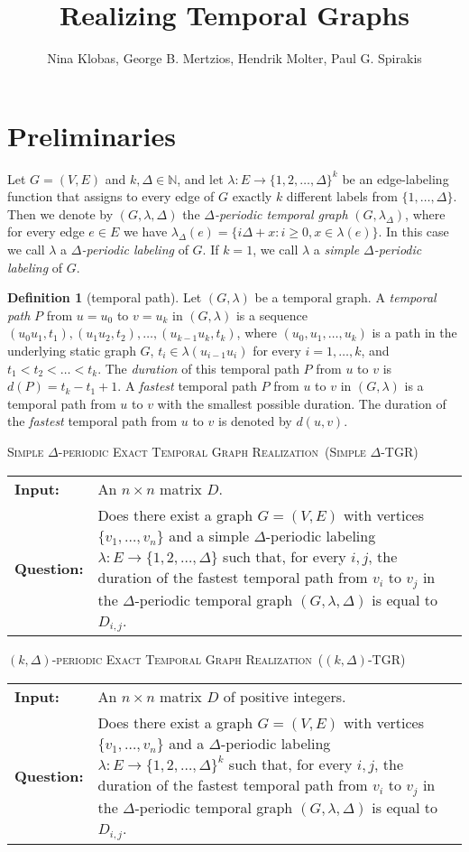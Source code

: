 \documentclass[11pt,a4paper]{article}
\title{Realizing Temporal Graphs}
\author{Nina Klobas, George B. Mertzios, Hendrik Molter, Paul G. Spirakis}
\makeatletter
\theoremstyle{remark}
\theoremstyle{definition}
\newtheorem{definition}[theorem]{Definition}
\newcommand{\problemdef}[3]{
	\begin{center}
		\begin{minipage}{0.95\textwidth}
			\noindent
			#1
			\vspace{5pt}\\
			\setlength{\tabcolsep}{3pt}
			\begin{tabularx}{\textwidth}{@{}lX@{}}
				\textbf{Input:}& #2 \\
				\textbf{Question:}& #3
			\end{tabularx}
		\end{minipage}
	\end{center}
}
\newcommand{\deltaExactLong}{\textsc{Simple $\Delta$-periodic Exact Temporal Graph Realization}}
\newcommand{\deltaExact}{\textsc{Simple $\Delta$-TGR}}
\newcommand{\kDeltaExactLong}{\textsc{$(k,\Delta)$-periodic Exact Temporal Graph Realization}}
\newcommand{\kDeltaExact}{\textsc{$(k,\Delta)$-TGR}}
\makeatother
\begin{document}
	\maketitle

\section{Preliminaries}

Let $G=(V,E)$ and $k,\Delta\in \mathbb{N}$, and let $\lambda: E \rightarrow \{1,2,\ldots,\Delta\}^k$ be an edge-labeling function that assigns to every edge of $G$ exactly $k$ different labels from $\{1,\ldots,\Delta\}$. 
Then we denote by $(G,\lambda,\Delta)$ the \emph{$\Delta$-periodic temporal graph} $(G,\lambda_{\Delta})$, where for every edge $e\in E$ we have $\lambda_{\Delta}(e)=\{i\Delta + x : i\geq 0, x\in \lambda(e)\}$. 
In this case we call $\lambda$ a \emph{$\Delta$-periodic labeling} of $G$. If $k=1$, we call $\lambda$ a \emph{simple $\Delta$-periodic labeling} of $G$.

\begin{definition}[temporal path]
Let $(G,\lambda)$ be a temporal graph. A \emph{temporal path} $P$ from $u=u_0$ to $v=u_k$ in $(G,\lambda)$ is a sequence $(u_0 u_1,t_1),(u_1 u_2,t_2),\ldots,(u_{k-1} u_k,t_k)$, where $(u_0,u_1,\ldots,u_k)$ is a path in the underlying static graph $G$, $t_i\in \lambda(u_{i-1}u_i)$ for every $i=1,\ldots,k$, and $t_1<t_2<\ldots<t_k$. 
The \emph{duration} of this temporal path $P$ from $u$ to $v$ is $d(P)=t_k - t_1 + 1$.
A \emph{fastest} temporal path $P$ from $u$ to $v$ in $(G,\lambda)$ is a temporal path from $u$ to $v$ with the smallest possible duration.
The duration of the \emph{fastest} temporal path from $u$ to $v$ is denoted by $d(u,v)$.
\end{definition}




	
	
\problemdef{\deltaExactLong\ (\deltaExact)}
{An $n \times n$ matrix $D$.}
{Does there exist a graph $G=(V,E)$ with vertices $\{v_1,\ldots,v_{n}\}$ 
and a simple $\Delta$-periodic labeling $\lambda: E \rightarrow \{1,2,\ldots,\Delta\}$ such that, 
for every $i,j$, the duration of the fastest temporal path from $v_i$ to $v_j$ in the $\Delta$-periodic temporal graph $(G,\lambda,\Delta)$ is equal to $D_{i,j}$.}

\problemdef{\kDeltaExactLong\ (\kDeltaExact)}
{An $n \times n$ matrix $D$ of positive integers.}
{Does there exist a graph $G=(V,E)$ with vertices $\{v_1,\ldots,v_{n}\}$ 
and a $\Delta$-periodic labeling $\lambda: E \rightarrow \{1,2,\ldots,\Delta\}^k$ such that, 
for every $i,j$, the duration of the fastest temporal path from $v_i$ to $v_j$ in the $\Delta$-periodic temporal graph $(G,\lambda,\Delta)$ is equal to $D_{i,j}$.}
\end{document}
